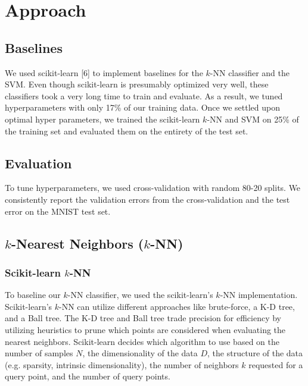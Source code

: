 \documentclass{article} %
\begin{document}
\section{Approach}

\subsection{Baselines}
We used scikit-learn [6] to implement baselines for the $k$-NN classifier and the SVM.
Even though scikit-learn is presumably optimized very well, these classifiers took a very
long time to train and evaluate. As a result, we tuned hyperparameters with only
17\% of our training data. Once we settled upon optimal hyper
parameters, we trained the scikit-learn $k$-NN and SVM on 25\% of the training set and evaluated
them on the entirety of the test set.


\subsection{Evaluation}
To tune hyperparameters, we used cross-validation with random 80-20 splits. We
consistently report the validation errors from the cross-validation and the test
error on the MNIST test set.

\subsection{$k$-Nearest Neighbors ($k$-NN)}
\subsubsection{Scikit-learn $k$-NN}
To baseline our $k$-NN classifier, we used
the scikit-learn's $k$-NN implementation.
Scikit-learn's $k$-NN can utilize different approaches like brute-force,
a K-D tree, and a Ball tree.
The K-D tree and Ball tree trade precision for efficiency by utilizing heuristics to
prune which points are considered when evaluating the nearest neighbors.
Scikit-learn
decides which algorithm to use based on the number of samples $N$, the
dimensionality of the data $D$, the
structure of the data (e.g. sparsity, intrinsic dimensionality), the number
of neighbors $k$ requested for a query point, and the number of query points.
\end{document}
